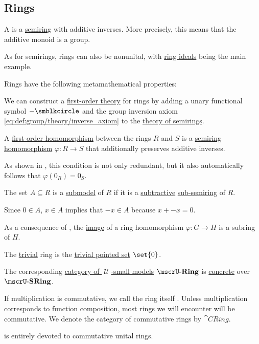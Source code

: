 \subsection{Rings}\label{subsec:rings}

\begin{definition}\label{def:ring}
  A  is a \hyperref[def:semiring]{semiring} with additive inverses. More precisely, this means that the additive monoid is a group.

  As for semirings, rings can also be nonunital, with \hyperref[def:semiring_ideal]{ring ideals} being the main example.

  Rings have the following metamathematical properties:
  \begin{thmenum}
     We can construct a \hyperref[def:first_order_theory]{first-order theory} for rings by adding a unary functional symbol \( -\anon \) and the group inversion axiom \eqref{eq:def:group/theory/inverse_axiom} to the \hyperref[def:semiring/theory]{theory of semirings}.

     A \hyperref[def:first_order_homomorphism]{first-order homomorphism} between the rings \( R \) and \( S \) is a \hyperref[def:semiring/homomorphism]{semiring homomorphism} \( \varphi: R \to S \) that additionally preserves additive inverses.

    As shown in , this condition is not only redundant, but it also automatically follows that \( \varphi(0_R) = 0_S \).

     The set \( A \subseteq R \) is a \hyperref[thm:substructure_is_model]{submodel} of \( R \) if it is a \hyperref[def:subtractive_sub_semimodule]{subtractive} \hyperref[def:semiring]{sub-semiring} of \( R \).

    Since \( 0 \in A \), \( x \in A \) implies that \( -x \in A \) because \( x + -x = 0 \).

    As a consequence of , the \hyperref[def:multi_valued_function/image]{image} of a ring homomorphism \( \varphi: G \to H \) is a subring of \( H \).

     The \hyperref[thm:substructures_form_complete_lattice/bottom]{trivial} ring is the \hyperref[def:pointed_set/trivial]{trivial pointed set} \( \set{ 0 } \).

     The corresponding \hyperref[def:category_of_small_first_order_models]{category of \( \mscrU \)-small models} \( \ucat{Ring} \) is \hyperref[def:concrete_category]{concrete} over \hyperref[def:monoid]{\( \ucat{SRing} \)}.

     If multiplication is commutative, we call the ring itself . Unless multiplication corresponds to function composition, most rings we will encounter will be commutative. We denote the category of commutative rings by \( \cat{CRing} \).

     is entirely devoted to commutative unital rings.
  \end{thmenum}
\end{definition}

